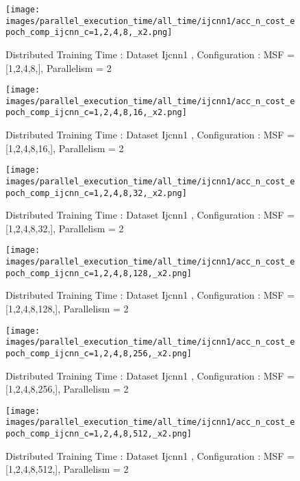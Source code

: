 \begin{figure*}[htbp]
\centering
\texttt{[image: images/parallel\_execution\_time/all\_time/ijcnn1/acc\_n\_cost\_epoch\_comp\_ijcnn\_c=1,2,4,8,\_x2.png]}
\caption{Distributed Training Time : Dataset Ijcnn1 , Configuration : MSF = [1,2,4,8,], Parallelism = 2}
\label{fig:dis-msf-tr-time-ijcnn1-x2}
\end{figure*}


\begin{figure*}[htbp]
\centering
\texttt{[image: images/parallel\_execution\_time/all\_time/ijcnn1/acc\_n\_cost\_epoch\_comp\_ijcnn\_c=1,2,4,8,16,\_x2.png]}
\caption{Distributed Training Time : Dataset Ijcnn1 , Configuration : MSF = [1,2,4,8,16,], Parallelism = 2}
\label{fig:dis-msf-tr-time-ijcnn1-x2}
\end{figure*}


\begin{figure*}[htbp]
\centering
\texttt{[image: images/parallel\_execution\_time/all\_time/ijcnn1/acc\_n\_cost\_epoch\_comp\_ijcnn\_c=1,2,4,8,32,\_x2.png]}
\caption{Distributed Training Time : Dataset Ijcnn1 , Configuration : MSF = [1,2,4,8,32,], Parallelism = 2}
\label{fig:dis-msf-tr-time-ijcnn1-x2}
\end{figure*}


\begin{figure*}[htbp]
\centering
\texttt{[image: images/parallel\_execution\_time/all\_time/ijcnn1/acc\_n\_cost\_epoch\_comp\_ijcnn\_c=1,2,4,8,128,\_x2.png]}
\caption{Distributed Training Time : Dataset Ijcnn1 , Configuration : MSF = [1,2,4,8,128,], Parallelism = 2}
\label{fig:dis-msf-tr-time-ijcnn1-x2}
\end{figure*}


\begin{figure*}[htbp]
\centering
\texttt{[image: images/parallel\_execution\_time/all\_time/ijcnn1/acc\_n\_cost\_epoch\_comp\_ijcnn\_c=1,2,4,8,256,\_x2.png]}
\caption{Distributed Training Time : Dataset Ijcnn1 , Configuration : MSF = [1,2,4,8,256,], Parallelism = 2}
\label{fig:dis-msf-tr-time-ijcnn1-x2}
\end{figure*}


\begin{figure*}[htbp]
\centering
\texttt{[image: images/parallel\_execution\_time/all\_time/ijcnn1/acc\_n\_cost\_epoch\_comp\_ijcnn\_c=1,2,4,8,512,\_x2.png]}
\caption{Distributed Training Time : Dataset Ijcnn1 , Configuration : MSF = [1,2,4,8,512,], Parallelism = 2}
\label{fig:dis-msf-tr-time-ijcnn1-x2}
\end{figure*}


